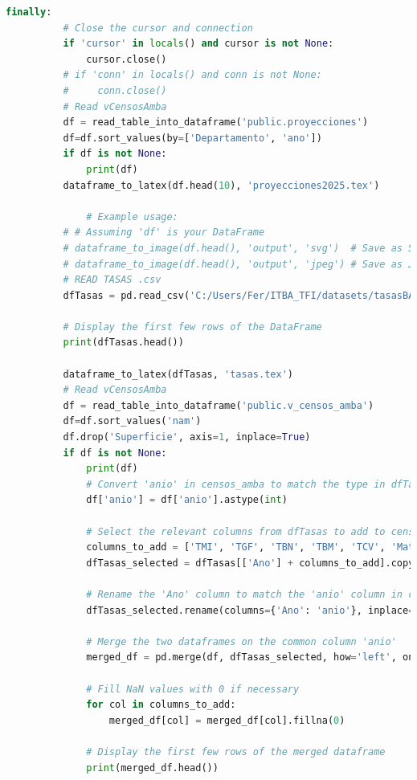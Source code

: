 \documentclass{article}
\theoremstyle{mytheoremstyle}
\theoremstyle{mytheoremstyle}
\theoremstyle{myproblemstyle}
\begin{document}
\begin{lstlisting}[language=Python, caption= Regresion Lineal.ipynb,label={lst:LR.ipynb}]
      finally:
          # Close the cursor and connection
          if 'cursor' in locals() and cursor is not None:
              cursor.close()
          # if 'conn' in locals() and conn is not None:
          #     conn.close()
          # Read vCensosAmba
          df = read_table_into_dataframe('public.proyecciones')
          df=df.sort_values(by=['Departamento', 'ano'])
          if df is not None:
              print(df)
          dataframe_to_latex(df.head(10), 'proyecciones2025.tex')
          
              # Example usage:
          # # Assuming 'df' is your DataFrame
          # dataframe_to_image(df.head(), 'output', 'svg')  # Save as SVG image
          # dataframe_to_image(df.head(), 'output', 'jpeg') # Save as JPEG image
          # READ TASAS .csv
          dfTasas = pd.read_csv('C:/Users/Fer/ITBA_TFI/datasets/tasasBA.csv',sep=';', header='infer')
          
          # Display the first few rows of the DataFrame
          print(dfTasas.head())
          
          dataframe_to_latex(dfTasas, 'tasas.tex')       
          # Read vCensosAmba
          df = read_table_into_dataframe('public.v_censos_amba')
          df=df.sort_values('nam')
          df.drop('Superficie', axis=1, inplace=True)
          if df is not None:
              print(df)
              # Convert 'anio' in censos_amba to match the type in dfTasas
              df['anio'] = df['anio'].astype(int)
              
              # Select the relevant columns from dfTasas to add to censos_amba
              columns_to_add = ['TMI', 'TGF', 'TBN', 'TBM', 'TCV', 'Mat1ria']
              dfTasas_selected = dfTasas[['Ano'] + columns_to_add].copy()
              
              # Rename the 'Ano' column to match the 'anio' column in censos_amba
              dfTasas_selected.rename(columns={'Ano': 'anio'}, inplace=True)
              
              # Merge the two dataframes on the common column 'anio'
              merged_df = pd.merge(df, dfTasas_selected, how='left', on='anio')
              
              # Fill NaN values with 0 if necessary
              for col in columns_to_add:
                  merged_df[col] = merged_df[col].fillna(0)
              
              # Display the first few rows of the merged dataframe
              print(merged_df.head())               
    

\end{lstlisting}
\end{document}
